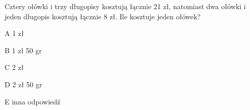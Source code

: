 \begin{tresc}
Cztery ołówki i trzy długopisy kosztują łącznie 21 zł, natomiast dwa ołówki i jeden długopis kosztują łącznie 8 zł. Ile kosztuje jeden ołówek?
\end{tresc}
\begin{wariant}{A} 1 zł \end{wariant}
\begin{wariant}{B} 1 zł 50 gr \end{wariant}
\begin{wariant}{C} 2 zł \end{wariant}
\begin{wariant}{D} 2 zł 50 gr \end{wariant}
\begin{wariant}{E} inna odpowiedź \end{wariant}
